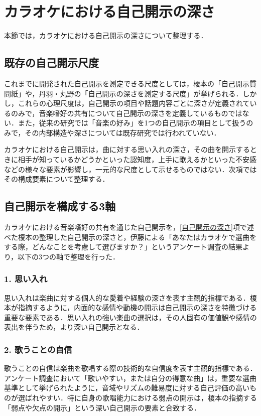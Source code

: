 \section{カラオケにおける自己開示の深さ}\label{カラオケにおける自己開示の深さ}
本節では，カラオケにおける自己開示の深さについて整理する． 

\subsection{既存の自己開示尺度}
これまでに開発された自己開示を測定できる尺度としては，榎本の「自己開示質問紙」\cite{榎本_1997_自己開示の心理学的研究}や，丹羽・丸野の「自己開示の深さを測定する尺度」\cite{自己開示尺度}が挙げられる．しかし，これらの心理尺度は，自己開示の項目や話題内容ごとに深さが定義されているのみで，音楽嗜好の共有について自己開示の深さを定義しているものではない．また，従来の研究では「音楽の好み」を1つの自己開示の項目として扱うのみで，その内部構造や深さについては既存研究では行われていない．

カラオケにおける自己開示は，曲に対する思い入れの深さ，その曲を開示するときに相手が知っているかどうかといった認知度，上手に歌えるかといった不安感などの様々な要素が影響し，一元的な尺度として示せるものではない．次項ではその構成要素について整理する．



\subsection{自己開示を構成する3軸}\label{3軸}
カラオケにおける音楽嗜好の共有を通じた自己開示を，\ref{自己開示の深さ}項で述べた榎本の整理した自己開示の深さと，伊藤\cite{カラオケにおける自動楽曲推薦}による「あなたはカラオケで選曲をする際，どんなことを考慮して選びますか？」というアンケート調査の結果より，以下の3つの軸で整理を行った．

\subsubsection{1. 思い入れ}
思い入れは楽曲に対する個人的な愛着や経験の深さを表す主観的指標である．榎本が指摘するように，内面的な感情や動機の開示は自己開示の深さを特徴づける重要な要素である．思い入れの強い楽曲の選択は，その人固有の価値観や感情の表出を伴うため，より深い自己開示となる．

\subsubsection{2. 歌うことの自信}
歌うことの自信は楽曲を歌唱する際の技術的な自信度を表す主観的指標である．アンケート調査において「歌いやすい，または自分の得意な曲」は，重要な選曲基準として挙げられたように，音域やリズムの難易度に対する自己評価の高いものが選ばれやすい．特に自身の歌唱能力における弱点の開示は，榎本の指摘する「弱点や欠点の開示」という深い自己開示の要素と合致する．

